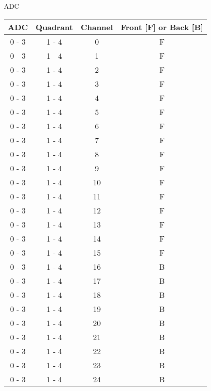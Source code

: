\caption{ADC}
\label{tab:ADC}
\begin{tabular}{cccc}
\hline
ADC    & Quadrant & Channel & Front [F] or Back [B] \\
\hline
0 - 3  &  1 - 4   &  0      &  F                    \\
0 - 3  &  1 - 4   &  1      &  F                    \\
0 - 3  &  1 - 4   &  2      &  F                    \\
0 - 3  &  1 - 4   &  3      &  F                    \\
0 - 3  &  1 - 4   &  4      &  F                    \\
0 - 3  &  1 - 4   &  5      &  F                    \\
0 - 3  &  1 - 4   &  6      &  F                    \\
0 - 3  &  1 - 4   &  7      &  F                    \\
0 - 3  &  1 - 4   &  8      &  F                    \\
0 - 3  &  1 - 4   &  9      &  F                    \\
0 - 3  &  1 - 4   &  10     &  F                    \\
0 - 3  &  1 - 4   &  11     &  F                    \\
0 - 3  &  1 - 4   &  12     &  F                    \\
0 - 3  &  1 - 4   &  13     &  F                    \\
0 - 3  &  1 - 4   &  14     &  F                    \\
0 - 3  &  1 - 4   &  15     &  F                    \\
0 - 3  &  1 - 4   &  16     &  B                    \\
0 - 3  &  1 - 4   &  17     &  B                    \\
0 - 3  &  1 - 4   &  18     &  B                    \\
0 - 3  &  1 - 4   &  19     &  B                    \\
0 - 3  &  1 - 4   &  20     &  B                    \\
0 - 3  &  1 - 4   &  21     &  B                    \\
0 - 3  &  1 - 4   &  22     &  B                    \\
0 - 3  &  1 - 4   &  23     &  B                    \\
0 - 3  &  1 - 4   &  24     &  B                    \\

\end{tabular}
